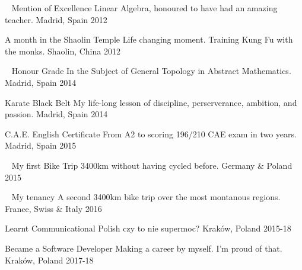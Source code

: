 
\begin{cvhonors}

  \cvhonor
    {\faUniversity \,\,\, Mention of Excellence} %
    {Linear Algebra, honoured to have had an amazing teacher.} %
    {Madrid, Spain} %
    {2012} %

  \cvhonor
    {\faTrophy \quad A month in the Shaolin Temple} %
    {Life changing moment. Training Kung Fu with the monks.} %
    {Shaolin, China} %
    {2012} %

  \cvhonor
    {\faUniversity \,\,\, Honour Grade} %
    {In the Subject of General Topology in Abstract Mathematics.} %
    {Madrid, Spain} %
    {2014} %

  \cvhonor
    {\faTrophy \quad Karate Black Belt} %
    {My life-long lesson of discipline, perserverance, ambition, and passion.} %
    {Madrid, Spain} %
    {2014} %

  \cvhonor
    {\faCertificate \quad C.A.E. English Certificate} %
    {From A2 to scoring 196/210 CAE exam in two years.} %
    {Madrid, Spain} %
    {2015} %

  \cvhonor
    {\faBicycle \,\,\, My first Bike Trip} %
    {3400km without having cycled before.} %
    {Germany \& Poland} %
    {2015} %

  \cvhonor
    {\faBicycle \,\,\, My tenancy} %
    {A second 3400km bike trip over the most montanous regions.} %
    {France, Swiss \& Italy} %
    {2016} %

\cvhonor
	{\faLanguage \quad Learnt Communicational Polish} %
	{czy to nie supermoc?} %
	{Kraków, Poland} %
	{2015-18} %

  \cvhonor
    {\faLanguage \quad Became a Software Developer} %
    {Making a career by myself. I'm proud of that.} %
    {Kraków, Poland} %
    {2017-18} %

\end{cvhonors}